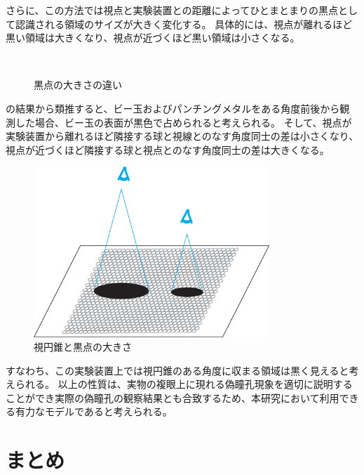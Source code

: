 さらに、この方法では視点と実験装置との距離によってひとまとまりの黒点として認識される領域のサイズが大きく変化する。
具体的には、視点が離れるほど黒い領域は大きくなり、視点が近づくほど黒い領域は小さくなる。
\begin{figure}[htbp]
  \centering
{}
\\
  \caption{黒点の大きさの違い}
  \label{FExpDistSpot}
\end{figure}
の結果から類推すると、ビー玉およびパンチングメタルをある角度前後から観測した場合、ビー玉の表面が黒色で占められると考えられる。
そして、視点が実験装置から離れるほど隣接する球と視線とのなす角度同士の差は小さくなり、視点が近づくほど隣接する球と視点とのなす角度同士の差は大きくなる。
\begin{figure}[htbp]
  \centering
  \includegraphics[width=3.5in]{./img/exp_eyedistance.eps}
  \caption{視円錐と黒点の大きさ}
  \label{FExpEyeDist}
\end{figure}

すなわち、この実験装置上では視円錐のある角度に収まる領域は黒く見えると考えられる。
以上の性質は、実物の複眼上に現れる偽瞳孔現象を適切に説明することができ実際の偽瞳孔の観察結果とも合致するため、本研究において利用できる有力なモデルであると考えられる。

\section{まとめ}
\label{SEcperimentTotal}

